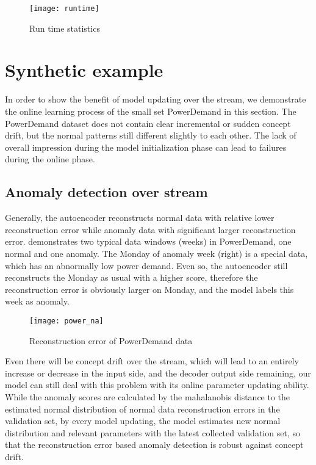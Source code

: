 \begin{figure}[h]
\centering
\texttt{[image: runtime]}
\caption[Run time statistics]{Run time statistics}
\label{fig:runtime}
\end{figure}


\section{Synthetic example}
\label{sec:synthetic}

In order to show the benefit of model updating over the stream, we demonstrate the online learning process of the small set PowerDemand in this section. The PowerDemand dataset does not contain clear incremental or sudden concept drift, but the normal patterns still different slightly to each other. The lack of overall impression during the model initialization phase can lead to failures during the online phase. \\

\subsection{Anomaly detection over stream}
\label{sec:detection}

Generally, the autoencoder reconstructs normal data with relative lower reconstruction error while anomaly data with significant larger reconstruction error.  demonstrates two typical data windows (weeks) in PowerDemand, one normal and one anomaly. The Monday of anomaly week (right) is a special data, which has an abnormally low power demand. Even so, the autoencoder still reconstructs the Monday as usual with a higher score, therefore the reconstruction error is obviously larger on Monday, and the model labels this week as anomaly.\\

\begin{figure}[h]
\centering
\texttt{[image: power\_na]}
\caption[Reconstruction error of PowerDemand data]{Reconstruction error of PowerDemand data}
\label{fig:power_re}
\end{figure}

Even there will be concept drift over the stream, which will lead to an entirely increase or decrease in the input side, and the decoder output side remaining, our model can still deal with this problem with its online parameter updating ability. While the anomaly scores are calculated by the mahalanobis distance to the estimated normal distribution of normal data reconstruction errors in the validation set, by every model updating, the model estimates new normal distribution and relevant parameters with the latest collected validation set, so that the reconstruction error based anomaly detection is robust against concept drift.\\



